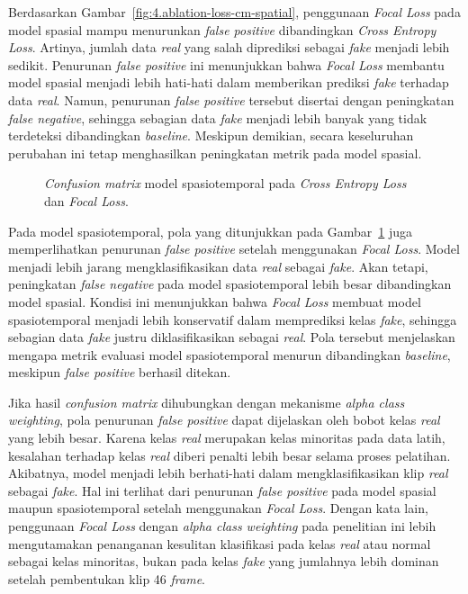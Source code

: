 Berdasarkan Gambar~\ref{fig:4.ablation-loss-cm-spatial}, penggunaan \textit{Focal Loss} pada model spasial mampu menurunkan \textit{false positive} dibandingkan \textit{Cross Entropy Loss}. Artinya, jumlah data \textit{real} yang salah diprediksi sebagai \textit{fake} menjadi lebih sedikit. Penurunan \textit{false positive} ini menunjukkan bahwa \textit{Focal Loss} membantu model spasial menjadi lebih hati-hati dalam memberikan prediksi \textit{fake} terhadap data \textit{real}. Namun, penurunan \textit{false positive} tersebut disertai dengan peningkatan \textit{false negative}, sehingga sebagian data \textit{fake} menjadi lebih banyak yang tidak terdeteksi dibandingkan \textit{baseline}. Meskipun demikian, secara keseluruhan perubahan ini tetap menghasilkan peningkatan metrik pada model spasial.

\begin{figure}[htbp]
\centering
{}
\caption{\textit{Confusion matrix} model spasiotemporal pada \textit{Cross Entropy Loss} dan \textit{Focal Loss}.}
\label{fig:4.ablation-loss-cm-spatiotemporal}	
\end{figure}

Pada model spasiotemporal, pola yang ditunjukkan pada Gambar~\ref{fig:4.ablation-loss-cm-spatiotemporal} juga memperlihatkan penurunan \textit{false positive} setelah menggunakan \textit{Focal Loss}. Model menjadi lebih jarang mengklasifikasikan data \textit{real} sebagai \textit{fake}. Akan tetapi, peningkatan \textit{false negative} pada model spasiotemporal lebih besar dibandingkan model spasial. Kondisi ini menunjukkan bahwa \textit{Focal Loss} membuat model spasiotemporal menjadi lebih konservatif dalam memprediksi kelas \textit{fake}, sehingga sebagian data \textit{fake} justru diklasifikasikan sebagai \textit{real}. Pola tersebut menjelaskan mengapa metrik evaluasi model spasiotemporal menurun dibandingkan \textit{baseline}, meskipun \textit{false positive} berhasil ditekan.

Jika hasil \textit{confusion matrix} dihubungkan dengan mekanisme \textit{alpha class weighting}, pola penurunan \textit{false positive} dapat dijelaskan oleh bobot kelas \textit{real} yang lebih besar. Karena kelas \textit{real} merupakan kelas minoritas pada data latih, kesalahan terhadap kelas \textit{real} diberi penalti lebih besar selama proses pelatihan. Akibatnya, model menjadi lebih berhati-hati dalam mengklasifikasikan klip \textit{real} sebagai \textit{fake}. Hal ini terlihat dari penurunan \textit{false positive} pada model spasial maupun spasiotemporal setelah menggunakan \textit{Focal Loss}. Dengan kata lain, penggunaan \textit{Focal Loss} dengan \textit{alpha class weighting} pada penelitian ini lebih mengutamakan penanganan kesulitan klasifikasi pada kelas \textit{real} atau normal sebagai kelas minoritas, bukan pada kelas \textit{fake} yang jumlahnya lebih dominan setelah pembentukan klip 46 \textit{frame}.


